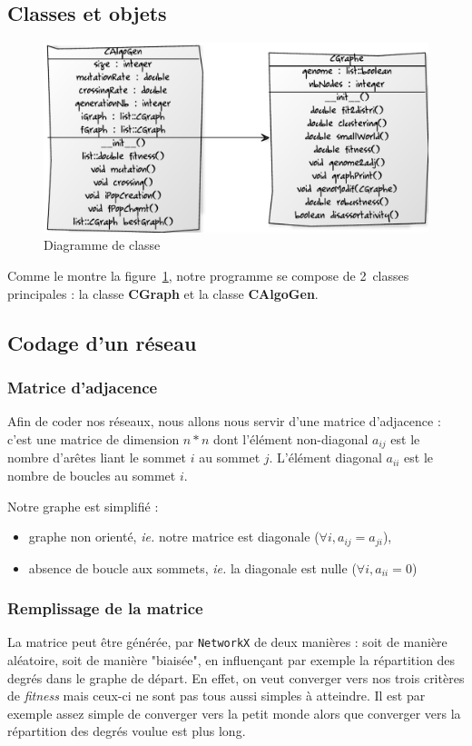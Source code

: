 \subsection{Classes et objets}
\begin{figure}
\includegraphics[width=\linewidth]{diagramme}
\caption{Diagramme de classe}
\label{diag}
\end{figure}
Comme le montre la figure~\ref{diag}, notre programme se compose de 2~classes principales : la classe \textbf{CGraph} et la classe \textbf{CAlgoGen}.

\subsection{Codage d'un réseau}
\subsubsection{Matrice d'adjacence}
Afin de coder nos réseaux, nous allons nous servir d'une matrice d'adjacence : c'est une matrice de dimension $n * n$ dont l'élément non-diagonal $a_{ij}$ est le nombre d'arêtes liant le sommet $i$ au sommet $j$. L'élément diagonal $a_{ii}$ est le nombre de boucles au sommet $i$.

Notre graphe est simplifié :
\begin{itemize}
 \item graphe non orienté, \textit{ie.} notre matrice est diagonale ($\forall i, a_{ij}=a_{ji}$),
 \item absence de boucle aux sommets, \textit{ie.} la diagonale est nulle ($\forall i, a_{ii}=0$)
\end{itemize}

\subsubsection{Remplissage de la matrice}
La matrice peut être générée, par \verb?NetworkX? de deux manières : soit de manière aléatoire, soit de manière "biaisée", en influençant par exemple la répartition des degrés dans le graphe de départ. En effet, on veut converger vers nos trois critères de \textit{fitness} mais ceux-ci ne sont pas tous aussi simples à atteindre. Il est par exemple assez simple de converger vers la petit monde alors que converger vers la répartition des degrés voulue est plus long.

